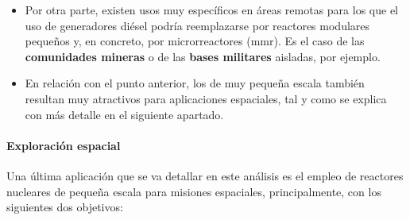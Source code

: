 \begin{itemize}
  \item Por otra parte, existen usos muy específicos en áreas remotas para los que el uso de generadores diésel podría reemplazarse por reactores modulares pequeños y, en concreto, por microrreactores (\acrshort{mmr}). Es el caso de las \textbf{comunidades mineras} o de las \textbf{bases militares} aisladas, por ejemplo.
  
  \item En relación con el punto anterior, los  de muy pequeña escala también resultan muy atractivos para aplicaciones espaciales, tal y como se explica con más detalle en el siguiente apartado. 
\end{itemize}

\paragraph{Exploración espacial} \label{exploracion_espacial}

Una última aplicación que se va detallar en este análisis es el empleo de reactores nucleares de pequeña escala para misiones espaciales, principalmente, con los siguientes dos objetivos:

